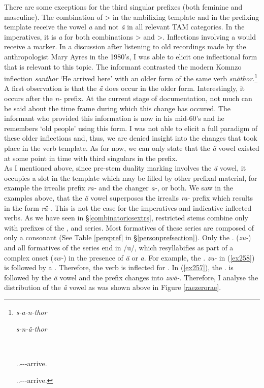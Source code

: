 There are some exceptions for the third singular prefixes (both feminine and masculine). The combination of \Sg>\Tsg{} in the ambifixing template and \Tsg{} in the prefixing template receive the vowel \emph{a} and not \emph{ä} in all relevant TAM categories. In the imperatives, it is \emph{a} for both combinations \Sg>\Tsg{} and \Pl>\Tsg{}. Inflections involving a   would receive a  marker. In a discussion after listening to old recordings made by the anthropologist Mary Ayres in the 1980's, I was able to elicit one inflectional form that is relevant to this topic. The informant contrasted the modern Komnzo inflection \emph{santhor} `He arrived here' with an older form of the same verb \emph{snäthor}.\footnote{\parbox{0.02cm}{\hfill}\parbox{6cm}{\emph{s-a-n-thor}} \parbox{5cm}{\emph{s-n-ä-thor}}\\ \parbox{0.1cm}{\hfill}\parbox{6cm}{\Tsg.\Masc.\Gam-\Ndu-\Venit-arrive.\Rs{}}  \parbox{15cm}{\Tsg.\Masc.\Gam-\Venit-\Ndu-arrive.\Rs}} A first observation is that the \emph{ä} does occur in the older form. Interestingly, it occurs after the  \emph{n-} prefix. At the current stage of documentation, not much can be said about the time frame during which this change has occured. The informant who provided this information is now in his mid-60's and he remembers `old people' using this form. I was not able to elicit a full paradigm of these older inflections and, thus, we are denied insight into the changes that took place in the verb template. As for now, we can only state that the  \emph{ä} vowel existed at some point in time with third singulars in the prefix.\\

As I mentioned above, since pre-stem duality marking involves the \emph{ä} vowel, it occupies a slot in the template which may be filled by other prefixal material, for example the irrealis prefix \emph{ra-} and the  changer \emph{a-}, or both. We saw in the examples above, that the  \emph{ä} vowel superposes the irrealis \emph{ra-} prefix which results in the form \emph{rä-}. This is not the case for the imperatives and indicative inflected verbs. As we have seen in \S{}\ref{combinatoricsextrs}, restricted stems combine only with prefixes of the \Bet{}, \Betatwo{} and \Gam{} series. Most formatives of these series are composed of only a consonant (See Table \ref{perspref} in \S{}\ref{personprefsection}). Only the \Fsg.\Gam{} (\emph{zu-}) and all formatives of the \Betatwo{} series end in /u/, which resyllabifies as part of a complex onset (\emph{zw-}) in the presence of \emph{ä} or \emph{a}. For example, the \Fsg.\Gam{} \emph{zu-} in (\ref{ex258}) is followed by a . Therefore, the verb is inflected for . In (\ref{ex257}), the \Fsg.\Gam{} is followed by the  \emph{ä} vowel and the prefix changes into \emph{zwä-}. Therefore, I analyse the distribution of the \emph{ä} vowel as was shown above in Figure \ref{raezerorae}.


